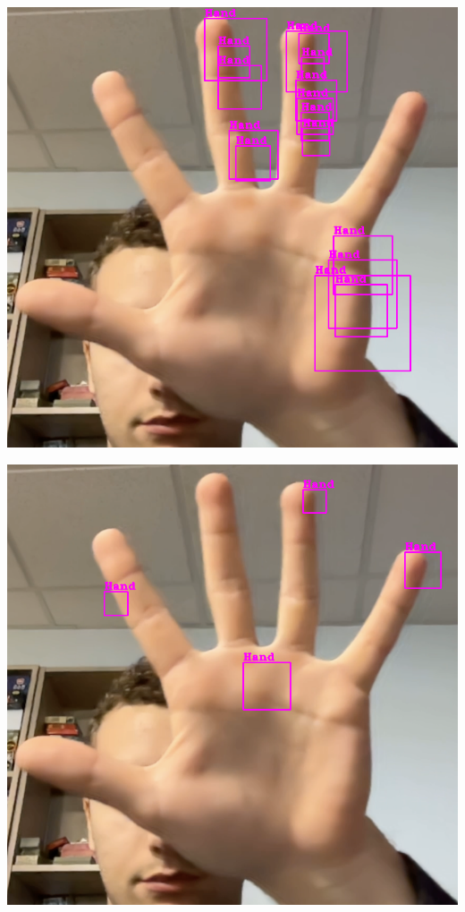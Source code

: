 \documentclass[11pt]{article}
\begin{document}
\begin{minipage}{0.45\textwidth}
    \centering
    \includegraphics[width=\textwidth]{images/cascade0.png}
    \label{fig:res_cascade0}
\end{minipage}
\begin{minipage}{0.45\textwidth}
    \centering
    \includegraphics[width=\textwidth]{images/cascade1.png}
    \label{fig:res_cascade1}
\end{minipage}
\end{document}
